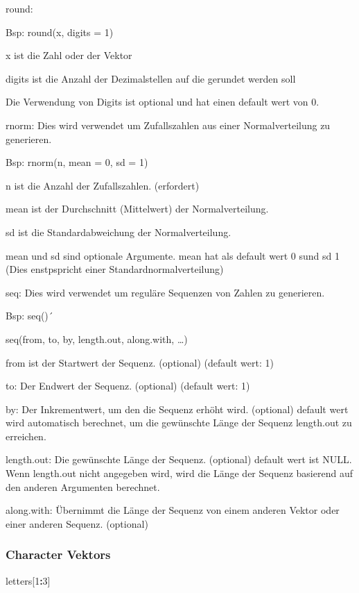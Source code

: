 \documentclass[
]{article}
\newenvironment{Shaded}{\begin{snugshade}}{\end{snugshade}}
\newcommand{\DecValTok}[1]{\textcolor[rgb]{0.00,0.00,0.81}{#1}}
\newcommand{\NormalTok}[1]{#1}
\newcommand{\SpecialCharTok}[1]{\textcolor[rgb]{0.81,0.36,0.00}{\textbf{#1}}}
\begin{document}
round:

Bsp: round(x, digits = 1)

x ist die Zahl oder der Vektor

digits ist die Anzahl der Dezimalstellen auf die gerundet werden soll

Die Verwendung von Digits ist optional und hat einen default wert von 0.

rnorm: Dies wird verwendet um Zufallszahlen aus einer Normalverteilung
zu generieren.

Bsp: rnorm(n, mean = 0, sd = 1)

n ist die Anzahl der Zufallszahlen. (erfordert)

mean ist der Durchschnitt (Mittelwert) der Normalverteilung.

sd ist die Standardabweichung der Normalverteilung.

mean und sd sind optionale Argumente. mean hat als default wert 0 sund
sd 1 (Dies enstpspricht einer Standardnormalverteilung)

seq: Dies wird verwendet um reguläre Sequenzen von Zahlen zu generieren.

Bsp: seq()´

seq(from, to, by, length.out, along.with, \ldots)

from ist der Startwert der Sequenz. (optional) (default wert: 1)

to: Der Endwert der Sequenz. (optional) (default wert: 1)

by: Der Inkrementwert, um den die Sequenz erhöht wird. (optional)
default wert wird automatisch berechnet, um die gewünschte Länge der
Sequenz length.out zu erreichen.

length.out: Die gewünschte Länge der Sequenz. (optional) default wert
ist NULL. Wenn length.out nicht angegeben wird, wird die Länge der
Sequenz basierend auf den anderen Argumenten berechnet.

along.with: Übernimmt die Länge der Sequenz von einem anderen Vektor
oder einer anderen Sequenz. (optional)

\hypertarget{character-vektors}{%
\subsubsection{Character Vektors}\label{character-vektors}}

\begin{Shaded}
\begin{Highlighting}[]
\NormalTok{letters[}\DecValTok{1}\SpecialCharTok{:}\DecValTok{3}\NormalTok{]}
\end{Highlighting}
\end{Shaded}
\end{document}
